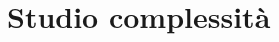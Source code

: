 \def\baselinestretch{1}
\section{Studio complessit\`a}
\def\baselinestretch{1.66}
\thispagestyle{headings}